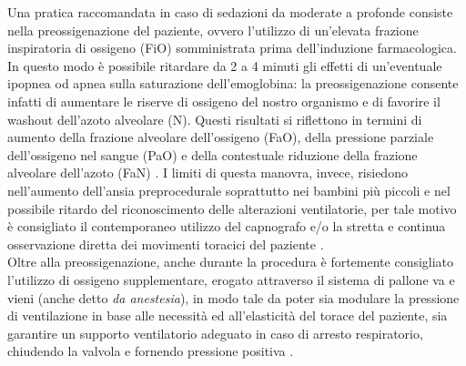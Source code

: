 Una pratica raccomandata in caso di sedazioni da moderate a profonde consiste nella preossigenazione del paziente, ovvero l'utilizzo di un'elevata frazione inspiratoria di ossigeno (FiO) somministrata prima dell'induzione farmacologica. In questo modo è possibile ritardare da 2 a 4 minuti gli effetti di un'eventuale ipopnea od apnea sulla saturazione dell'emoglobina: la preossigenazione consente infatti di aumentare le riserve di ossigeno del nostro organismo e di favorire il washout dell'azoto alveolare (N). Questi risultati si riflettono in termini di aumento della frazione alveolare dell'ossigeno (FaO), della pressione parziale dell'ossigeno nel sangue (PaO) e della contestuale riduzione della frazione alveolare dell'azoto (FaN) \cite{Nimmagadda2017}.
I limiti di questa manovra, invece, risiedono nell'aumento dell'ansia preprocedurale soprattutto nei bambini più piccoli e nel possibile ritardo del riconoscimento delle alterazioni ventilatorie, per tale motivo è consigliato il contemporaneo utilizzo del capnografo e/o la stretta e continua osservazione diretta dei movimenti toracici del paziente \cite{Fu2004}. 
\\Oltre alla preossigenazione, anche durante la procedura è fortemente consigliato l'utilizzo di ossigeno supplementare, erogato attraverso il sistema di pallone va e vieni (anche detto \emph{da anestesia}), in modo tale da poter sia modulare la pressione di ventilazione in base alle necessità ed all'elasticità del torace del paziente, sia garantire un supporto ventilatorio adeguato in caso di arresto respiratorio, chiudendo la valvola e fornendo pressione positiva \cite{Simeupsedazione}.

